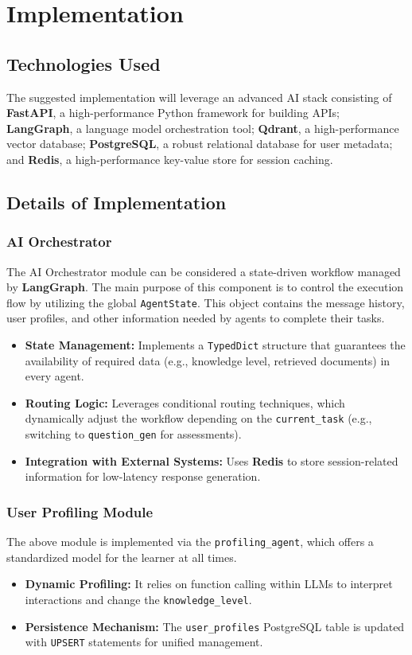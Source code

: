 \chapter{Implementation}

\section{Technologies Used}
The suggested implementation will leverage an advanced AI stack consisting of \textbf{FastAPI}, a high-performance Python framework for building APIs; \textbf{LangGraph}, a language model orchestration tool; \textbf{Qdrant}, a high-performance vector database; \textbf{PostgreSQL}, a robust relational database for user metadata; and \textbf{Redis}, a high-performance key-value store for session caching.

\section{Details of Implementation}

\subsection{AI Orchestrator}
The AI Orchestrator module can be considered a state-driven workflow managed by \textbf{LangGraph}. The main purpose of this component is to control the execution flow by utilizing the global \texttt{AgentState}. This object contains the message history, user profiles, and other information needed by agents to complete their tasks.
\begin{itemize}
	\item \textbf{State Management:} Implements a \texttt{TypedDict} structure that guarantees the availability of required data (e.g., knowledge level, retrieved documents) in every agent.
	\item \textbf{Routing Logic:} Leverages conditional routing techniques, which dynamically adjust the workflow depending on the \texttt{current\_task} (e.g., switching to \texttt{question\_gen} for assessments).
	\item \textbf{Integration with External Systems:} Uses \textbf{Redis} to store session-related information for low-latency response generation.
\end{itemize}

\subsection{User Profiling Module}
The above module is implemented via the \texttt{profiling\_agent}, which offers a standardized model for the learner at all times.
\begin{itemize}
	\item \textbf{Dynamic Profiling:} It relies on function calling within LLMs to interpret interactions and change the \texttt{knowledge\_level}.
	\item \textbf{Persistence Mechanism:} The \texttt{user\_profiles} PostgreSQL table is updated with \texttt{UPSERT} statements for unified management.
\end{itemize}

